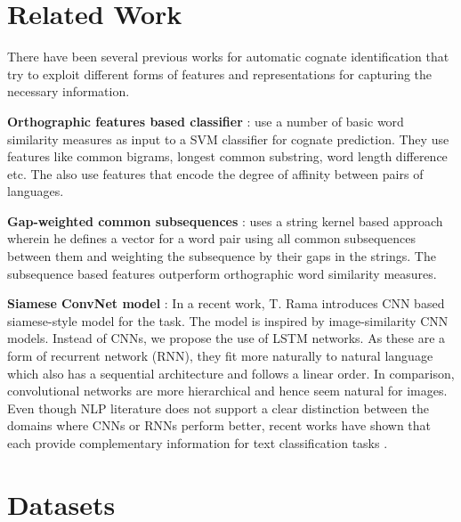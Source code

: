\documentclass[11pt,letterpaper]{article}
\begin{document}
\section{Related Work}

There have been several previous works for automatic cognate identification that try to exploit different forms of features and representations for capturing the necessary information.

\textbf{Orthographic features based classifier} : \cite{hauer2011clustering} use a number of basic word similarity measures as input to a SVM classifier for cognate prediction. They use features like common bigrams, longest common substring, word length difference etc. The also use features that encode the degree of affinity between pairs of languages.

\textbf{Gap-weighted common subsequences} : \cite{rama2015automatic} uses a string kernel based approach wherein he defines a vector for a word pair using all common subsequences between them and weighting the subsequence by their gaps in the strings. The subsequence based features outperform orthographic word similarity measures.

\textbf{Siamese ConvNet model} : In a recent work, T. Rama introduces CNN based siamese-style model \cite{rama2016siamese} for the task. The model is inspired by image-similarity CNN models. Instead of CNNs, we propose the use of LSTM networks. As these are a form of recurrent network (RNN), they fit more naturally to natural language which also has a sequential architecture and follows a linear order. In comparison, convolutional networks are more hierarchical and hence seem natural for images. Even though NLP literature does not support a clear distinction between the domains where CNNs or RNNs perform better, recent works have shown that each provide complementary information for text classification tasks \cite{yin2017comparative}. 




\section{Datasets}
\end{document}

